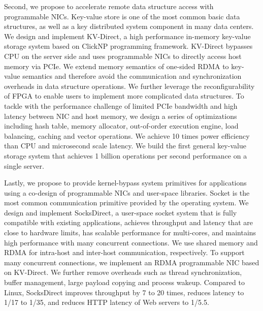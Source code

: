 \begin{enabstract}
Second, we propose to accelerate remote data structure access with programmable NICs. Key-value store is one of the most common basic data structures, as well as a key distributed system component in many data centers.
We design and implement KV-Direct, a high performance in-memory key-value storage system based on ClickNP programming framework.
KV-Direct bypasses CPU on the server side and uses programmable NICs to directly access host memory via PCIe.
We extend memory semantics of one-sided RDMA to key-value semantics and therefore avoid the communication and synchronization overheads in data structure operations.
We further leverage the reconfigurability of FPGA to enable users to implement more complicated data structures.
To tackle with the performance challenge of limited PCIe bandwidth and high latency between NIC and host memory, we design a series of optimizations including hash table, memory allocator, out-of-order execution engine, load balancing, caching and vector operations.
We achieve 10 times power efficiency than CPU and microsecond scale latency.
We build the first general key-value storage system that achieves 1 billion operations per second performance on a single server.

Lastly, we propose to provide kernel-bypass system primitives for applications using a co-design of programmable NICs and user-space libraries.
Socket is the most common communication primitive provided by the operating system.
We design and implement SocksDirect, a user-space socket system that is fully compatible with existing applications, achieves throughput and latency that are close to hardware limits, has scalable performance for multi-cores, and maintains high performance with many concurrent connections.
We use shared memory and RDMA for intra-host and inter-host communication, respectively.
To support many concurrent connections, we implement an RDMA programmable NIC based on KV-Direct.
We further remove overheads such as thread synchronization, buffer management, large payload copying and process wakeup.
Compared to Linux, SocksDirect improves throughput by 7 to 20 times, reduces latency to 1/17 to 1/35, and reduces HTTP latency of Web servers to 1/5.5.

\end{enabstract}
